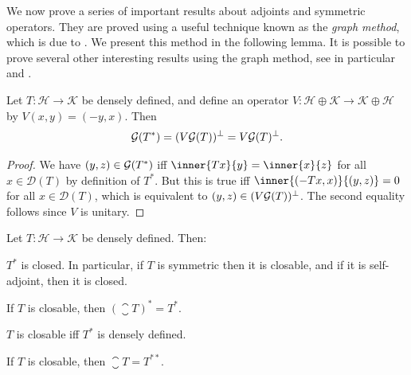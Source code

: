 \documentclass[article, a4paper, 11pt, oneside]{memoir}
\makeatletter
\numberwithin{equation}{chapter}
\newcommand{\calH}{\mathcal{H}}
\newcommand{\calK}{\mathcal{K}}
\newcommand{\dom}{\mathcal{D}}
\theoremstyle{myexample}
\theoremstyle{myexample}
\theoremstyle{myexamplebreak}
\theoremstyle{myexamplebreak}
\theoremstyle{nonumberplain}
\newtheorem{proof}{\protect\@proof}
\theoremstyle{MyNonumberplain}
\newcommand{\@proof}{}
\renewcommand{\@proof}{Proof}%
\renewcommand{\@proof}{Bevis}%
\makeatother
\begin{document}
We now prove a series of important results about adjoints and symmetric operators. They are proved using a useful technique known as the \emph{graph method}, which is due to \textcite{vonneumann1932}. We present this method in the following lemma. It is possible to prove several other interesting results using the graph method, see in particular \textcite[Theorem~13.11]{rudinfunctional} and \textcite[Theorem~1.8]{schmudgen2012}.

\begin{lemma}
    \label{thm:graph_method}
    Let $T \colon \calH \to \calK$ be densely defined, and define an operator $V \colon \calH \oplus \calK \to \calK \oplus \calH$ by $V(x,y) = (-y,x)$. Then
    \begin{equation*}
        \mathcal{G}(T^*) = (V \mathcal{G}(T))^\perp = V\mathcal{G}(T)^\perp.
    \end{equation*}
\end{lemma}

\begin{proof}
    We have $(y,z) \in \mathcal{G}(T^*)$ iff $\inner{Tx}{y} = \inner{x}{z}$ for all $x \in \dom(T)$ by definition of $T^*$. But this is true iff $\inner{(-Tx,x)}{(y,z)} = 0$ for all $x \in \dom(T)$, which is equivalent to $(y,z) \in (V \mathcal{G}(T))^\perp$. The second equality follows since $V$ is unitary.
\end{proof}


\begin{proposition}
    \label{thm:graph_method_results}
    Let $T \colon \calH \to \calK$ be densely defined. Then:
    \begin{enumprop}
        \item $T^*$ is closed. In particular, if $T$ is symmetric then it is closable, and if it is self-adjoint, then it is closed. \label{enum:adjoint_closed}
        
        \item If $T$ is closable, then $(\closure{T})^* = T^*$. \label{enum:adjoint_of_closure}
        
        \item $T$ is closable iff $T^*$ is densely defined. \label{enum:closable_iff_dense_adjoint}
        
        \item If $T$ is closable, then $\closure{T} = T^{**}$. \label{enum:closure_equals_double_adjoint}
    \end{enumprop}
\end{proposition}
\end{document}
